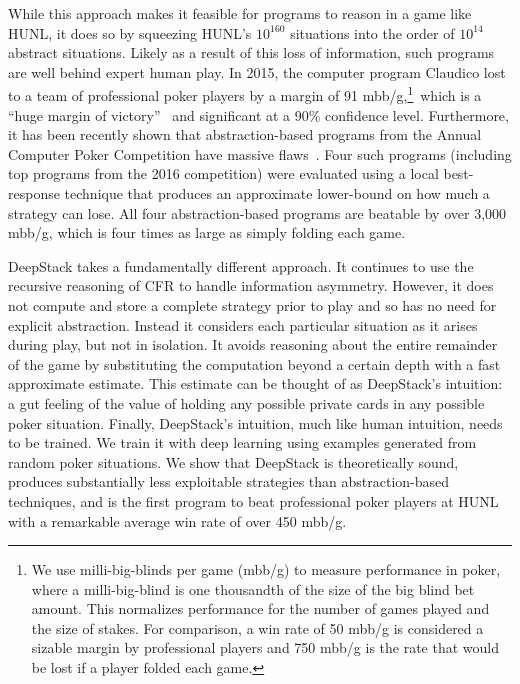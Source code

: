 \documentclass[12pt]{article}
\newcommand{\HUNL}{{HUNL}}
\begin{document}
While this approach makes it feasible for programs to reason in a game like \HUNL, it does so by squeezing \HUNL's $10^{160}$ situations into the order of $10^{14}$ abstract situations.  Likely as a result of this loss of information, such programs are well behind expert human play.  In 2015, the computer program Claudico lost to a team of professional poker players by a margin of 91 mbb/g,\footnote{We use milli-big-blinds per game (mbb/g) to measure performance in poker, where a milli-big-blind is one thousandth of the size of the big blind bet amount.  This normalizes performance for the number of games played and the size of stakes.  For comparison, a win rate of 50 mbb/g is considered a sizable margin by professional players and 750 mbb/g is the rate that would be lost if a player folded each game.\label{footnote:mbbh}}\ which is a ``huge margin of victory''~\cite{Wood15:PokerFuse-Claudico} and significant at a 90\% confidence level.  Furthermore, it has been recently shown that abstraction-based programs from the Annual Computer Poker Competition have massive flaws~\cite{Lisy16:LocalBR}. Four such programs (including top programs from the 2016 competition) were evaluated using a local best-response technique that produces an approximate lower-bound on how much a strategy can lose.  All four abstraction-based programs are beatable by over 3,000 mbb/g, which is four times as large as simply folding each game.

DeepStack takes a fundamentally different approach.  It continues to use the recursive reasoning of CFR to handle information asymmetry.  However, it does not compute and store a complete strategy prior to play and so has no need for explicit abstraction.  Instead it considers each particular situation as it arises during play, but not in isolation.  It avoids reasoning about the entire remainder of the game by substituting the computation beyond a certain depth with a fast approximate estimate.  This estimate can be thought of as DeepStack's intuition: a gut feeling of the value of holding any possible private cards in any possible poker situation.  Finally, DeepStack's intuition, much like human intuition, needs to be trained.  We train it with deep learning using examples generated from random poker situations.  We show that DeepStack is theoretically sound, produces substantially less exploitable strategies than abstraction-based techniques, and is the first program to beat professional poker players at \HUNL{} with a remarkable average win rate of over 450 mbb/g.
\end{document}
